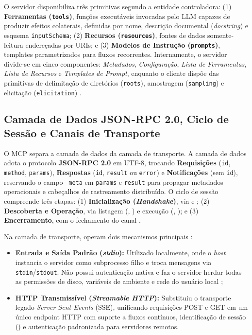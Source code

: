 O servidor disponibiliza três primitivas segundo a entidade controladora: (1) \textbf{Ferramentas (\texttt{tools})}, funções executáveis invocadas pelo LLM capazes de produzir efeitos colaterais, definidas por nome, descrição documental (\textit{docstring}) e esquema \texttt{inputSchema}; (2) \textbf{Recursos (\texttt{resources})}, fontes de dados somente-leitura endereçadas por URIs; e (3) \textbf{Modelos de Instrução (\texttt{prompts})}, templates parametrizados para fluxos recorrentes. Internamente, o servidor divide-se em cinco componentes: \textit{Metadados}, \textit{Configuração}, \textit{Lista de Ferramentas}, \textit{Lista de Recursos} e \textit{Templates de Prompt}, enquanto o cliente dispõe das primitivas de delimitação de diretórios (\texttt{roots}), amostragem (\texttt{sampling}) e elicitação (\texttt{elicitation}) \cite{hou2025mcp,hasan2026mcp}.

\subsection{Camada de Dados JSON-RPC 2.0, Ciclo de Sessão e Canais de Transporte}
\label{subsec:jsonrpc_transporte}

O MCP separa a camada de dados da camada de transporte. A camada de dados adota o protocolo \textbf{JSON-RPC 2.0} em UTF-8, trocando \textbf{Requisições} (\texttt{id}, \texttt{method}, \texttt{params}), \textbf{Respostas} (\texttt{id}, \texttt{result} ou \texttt{error}) e \textbf{Notificações} (sem \texttt{id}), reservando o campo \texttt{\_meta} em \texttt{params} e \texttt{result} para propagar metadados operacionais e cabeçalhos de rastreamento distribuído. O ciclo de sessão compreende três etapas: (1) \textbf{Inicialização (\textit{Handshake})}, via  e ; (2) \textbf{Descoberta e Operação}, via listagem (, ) e execução (, ); e (3) \textbf{Encerramento}, com o fechamento do canal \cite{hou2025mcp}.

Na camada de transporte, operam dois mecanismos principais \cite{guo2025measurement}:
\begin{itemize}
  \item \textbf{Entrada e Saída Padrão (\textit{stdio}):} Utilizado localmente, onde o \textit{host} instancia o servidor como subprocesso filho e troca mensagens via \texttt{stdin}/\texttt{stdout}. Não possui autenticação nativa e faz o servidor herdar todas as permissões de disco, variáveis de ambiente e rede do usuário local \cite{buhler2026agentbound};
  \item \textbf{HTTP Transmissível (\textit{Streamable HTTP}):} Substituiu o transporte legado \textit{Server-Sent Events} (SSE), unificando requisições POST e GET em um único endpoint HTTP com suporte a fluxos contínuos, identificação de sessão () e autenticação padronizada para servidores remotos.
\end{itemize}

